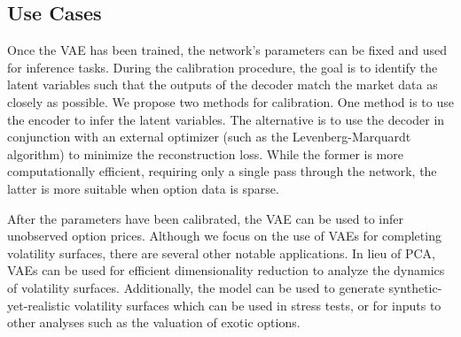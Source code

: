 \documentclass[12pt]{article}
\begin{document}
\subsection{Use Cases}\label{calibration}
Once the VAE has been trained, the network's parameters can be fixed and used for inference tasks. During the calibration procedure, the goal is to identify the latent variables such that the outputs of the decoder match the market data as closely as possible. We propose two methods for calibration. One method is to use the encoder to infer the latent variables. The alternative is to use the decoder in conjunction with an external optimizer (such as the Levenberg-Marquardt algorithm) to minimize the reconstruction loss. While the former is more computationally efficient, requiring only a single pass through the network, the latter is more suitable when option data is sparse. 

After the parameters have been calibrated, the VAE can be used to infer unobserved option prices. Although we focus on the use of VAEs for completing volatility surfaces, there are several other notable applications. In lieu of PCA, VAEs can be used for efficient dimensionality reduction to analyze the dynamics of volatility surfaces. Additionally, the model can be used to generate synthetic-yet-realistic volatility surfaces which can be used in stress tests, or for inputs to other analyses such as the valuation of exotic options.




\end{document}
